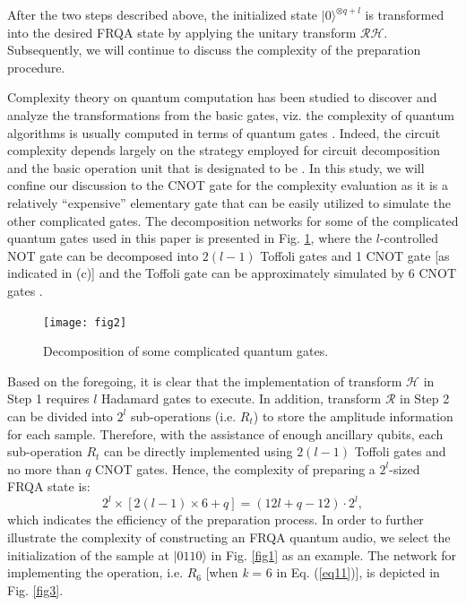 \documentclass[10pt,journal,compsoc]{IEEEtran}
\begin{document}
After the two steps described above, the initialized state ${\vert 0 \rangle}^{\otimes q + l}$ is transformed into the desired FRQA state by applying the unitary transform $\mathcal{R} \mathcal{H}$. Subsequently, we will continue to discuss the complexity of the preparation procedure.

Complexity theory on quantum computation has been studied to discover and analyze the transformations from the basic gates, viz. the complexity of quantum algorithms is usually computed in terms of quantum gates \cite{10}. Indeed, the circuit complexity depends largely on the strategy employed for circuit decomposition and the basic operation unit that is designated to be \cite{13}. In this study, we will confine our discussion to the CNOT gate for the complexity evaluation as it is a relatively ``expensive'' elementary gate that can be easily utilized to simulate the other complicated gates. The decomposition networks for some of the complicated quantum gates used in this paper is presented in Fig. \ref{fig2}, where the $l$-controlled NOT gate can be decomposed into $2(l-1)$ Toffoli gates and 1 CNOT gate [as indicated in (c)] and the Toffoli gate can be approximately simulated by 6 CNOT gates \cite{14}.

\begin{figure}[!t]
\centering
\texttt{[image: fig2]}
\caption{Decomposition of some complicated quantum gates.}
\label{fig2}
\end{figure}

Based on the foregoing, it is clear that the implementation of transform $\mathcal{H}$ in Step 1 requires $l$ Hadamard gates to execute. In addition, transform $\mathcal{R}$ in Step 2 can be divided into $2^l$ sub-operations (i.e. $R_t$) to store the amplitude information for each sample. Therefore, with the assistance of enough ancillary qubits, each sub-operation $R_t$ can be directly implemented using $2\left( l - 1 \right)$ Toffoli gates and no more than $q$ CNOT gates. Hence, the complexity of preparing a $2^l$-sized FRQA state is:
\begin{equation}\label{eq14}
2^l \times \left[ 2(l - 1) \times 6 + q \right] = \left( 12l + q - 12\right) \cdot 2^l,
\end{equation}
which indicates the efficiency of the preparation process. In order to further illustrate the complexity of constructing an FRQA quantum audio, we select the initialization of the sample at $\vert 0110\rangle$ in Fig. \ref{fig1} as an example. The network for implementing the operation, i.e. $R_6$ [when \emph{k} = 6 in Eq. (\ref{eq11})], is depicted in Fig. \ref{fig3}.
\end{document}
